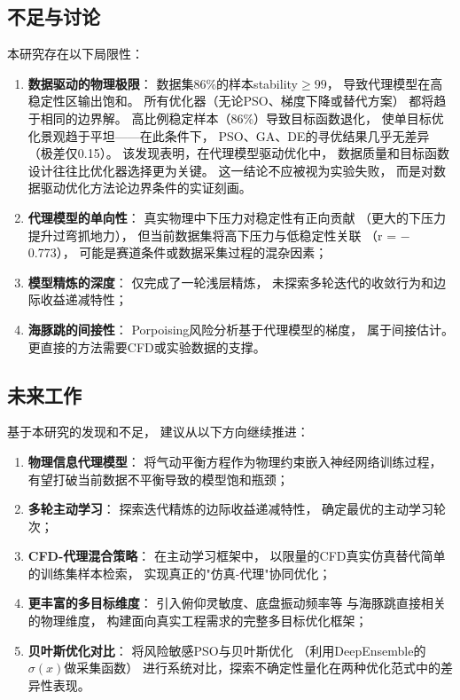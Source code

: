 \subsection{不足与讨论}

本研究存在以下局限性：

\begin{enumerate}
    \item \textbf{数据驱动的物理极限}：
        数据集86\%的样本stability$\geq 99$，
        导致代理模型在高稳定性区输出饱和。
        所有优化器（无论PSO、梯度下降或替代方案）
        都将趋于相同的边界解。
        高比例稳定样本（86\%）导致目标函数退化，
使单目标优化景观趋于平坦——在此条件下，
PSO、GA、DE的寻优结果几乎无差异（极差仅0.15）。
该发现表明，在代理模型驱动优化中，
数据质量和目标函数设计往往比优化器选择更为关键。
这一结论不应被视为实验失败，
而是对数据驱动优化方法论边界条件的实证刻画。
    \item \textbf{代理模型的单向性}：
        真实物理中下压力对稳定性有正向贡献
        （更大的下压力提升过弯抓地力），
        但当前数据集将高下压力与低稳定性关联
        （r = $-$0.773），
        可能是赛道条件或数据采集过程的混杂因素；
    \item \textbf{模型精炼的深度}：
        仅完成了一轮浅层精炼，
        未探索多轮迭代的收敛行为和边际收益递减特性；
    \item \textbf{海豚跳的间接性}：
        Porpoising风险分析基于代理模型的梯度，
        属于间接估计。
        更直接的方法需要CFD或实验数据的支撑。
\end{enumerate}

\subsection{未来工作}

基于本研究的发现和不足，
建议从以下方向继续推进：

\begin{enumerate}
    \item \textbf{物理信息代理模型}：
        将气动平衡方程作为物理约束嵌入神经网络训练过程，
        有望打破当前数据不平衡导致的模型饱和瓶颈；
    \item \textbf{多轮主动学习}：
        探索迭代精炼的边际收益递减特性，
        确定最优的主动学习轮次；
    \item \textbf{CFD-代理混合策略}：
        在主动学习框架中，
        以限量的CFD真实仿真替代简单的训练集样本检索，
        实现真正的"仿真-代理"协同优化；
    \item \textbf{更丰富的多目标维度}：
        引入俯仰灵敏度、底盘振动频率等
        与海豚跳直接相关的物理维度，
        构建面向真实工程需求的完整多目标优化框架；
    \item \textbf{贝叶斯优化对比}：
        将风险敏感PSO与贝叶斯优化
        （利用DeepEnsemble的$\sigma(x)$做采集函数）
        进行系统对比，探索不确定性量化在两种优化范式中的差异性表现。
\end{enumerate}
